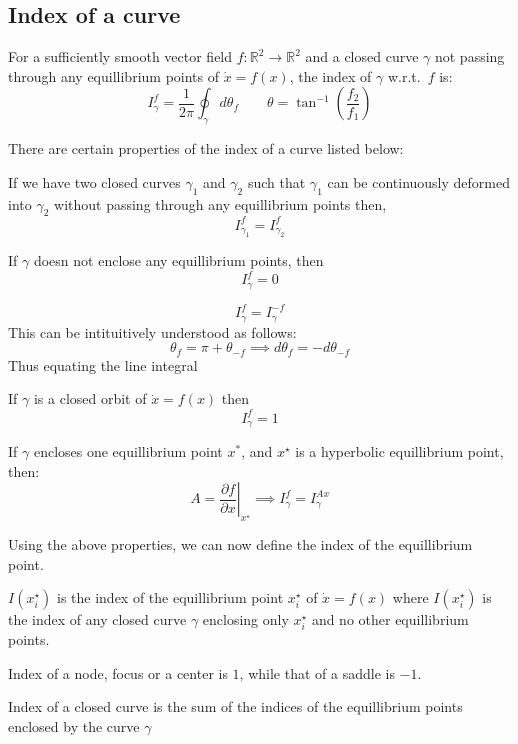 \subsection{Index of a curve}
\begin{definition}
    For a sufficiently smooth vector field \(f: \mathbb{R} ^{2} \to \mathbb{R} ^{2} \) and a 
    closed curve \(\gamma \) not passing through any equillibrium points of \(\dot{x} = f(x)\), the
    index of \(\gamma\) w.r.t.\ \(f\) is:
    \[
        I^f_\gamma = \frac{1}{2\pi} \oint_{\gamma} d\theta_f \qquad \theta = \tan^{-1} \left( 
            \frac{f_2}{f_1}
         \right)
    \]
\end{definition}
\vspace{1em}
There are certain properties of the index of a curve listed below:
\begin{property}[1]
    If we have two closed curves \(\gamma_1\) and \(\gamma_2\) such that \(\gamma_1\)
    can be continuously deformed into \(\gamma_2\) without passing through any equillibrium
    points then,
    \[
        I^f_{\gamma_1} = I^f_{\gamma_2}
    \]
\end{property}
\begin{property}[2]
    If \(\gamma \) doesn not enclose any equillibrium points, then
    \[
        I^f_{\gamma} = 0
    \] 
\end{property}
\begin{property}[3]
    \[
        I^f_\gamma = I^{-f}_\gamma 
    \]
    This can be intituitively understood as follows:
    \[
        \theta _f = \pi + \theta _{-f} \implies d\theta _f = - d\theta _{-f}
    \]
    Thus equating the line integral
\end{property}
\begin{property}[4]
    If \(\gamma \) is a closed orbit of \(\dot{x} = f(x)\) then
    \[
        I^f_\gamma = 1
    \]
\end{property}
\begin{property}[5]
    If \(\gamma \) encloses one equillibrium point \(x^*\), and \(x^{\star} \) is
    a hyperbolic equillibrium point, then:
    \[
        A = \left. \frac{\partial f}{\partial x} \right|_{x^{\star}} \implies 
        I^f_\gamma = I^{Ax}_\gamma 
    \] 
\end{property}

Using the above properties, we can now define the index of the equillibrium point.

\begin{definition}
\(I(x^{\star} _i)\) is the index of the equillibrium point \(x^{\star} _i\) of \(\dot{x} = f(x)\)
where \(I(x^{\star} _i)\) is the index of any closed curve \(\gamma \) enclosing only
\(x^{\star} _i\) and no other equillibrium points.  
\end{definition}
\begin{lemma}
    Index of a node, focus or a center is \(1\), while that of a saddle is \(-1\).
\end{lemma}
\begin{lemma}
    Index of a closed curve is the sum of the indices of the equillibrium points enclosed
    by the curve \(\gamma \)
\end{lemma}

